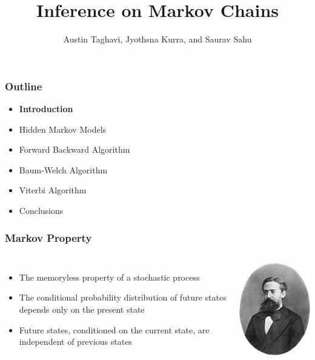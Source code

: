 \documentclass{beamer}
\title{Inference on Markov Chains}
\author{Austin Taghavi, Jyothsna Kurra, and Saurav Sahu}
\institute{Electrical and Computer Engineering \\ Texas A\&M University}
\begin{document}
\begin{frame}
  \titlepage
\end{frame}


\begin{frame}
\frametitle{Outline}
\begin{itemize}
\item \textbf{Introduction}
\item\vspace{0.5cm} Hidden Markov Models
\item\vspace{0.5cm} Forward Backward Algorithm
\item \vspace{0.5cm} Baum-Welch Algorithm
\item \vspace{0.5cm} Viterbi Algorithm
\item \vspace{0.5cm} Conclusions
\end{itemize}
\end{frame}

\begin{frame}
\frametitle{Markov Property}
\begin{columns}
\begin{itemize}
\item The memoryless property of a stochastic process
\item The conditional probability distribution of future states depends only on the present state
\item Future states, conditioned on the current state, are independent of previous states
\end{itemize}
  \begin{center}
\includegraphics[width=5cm]{Figures/AAMarkov}
  \end{center}
\end{columns}
\end{frame}
\end{document}
